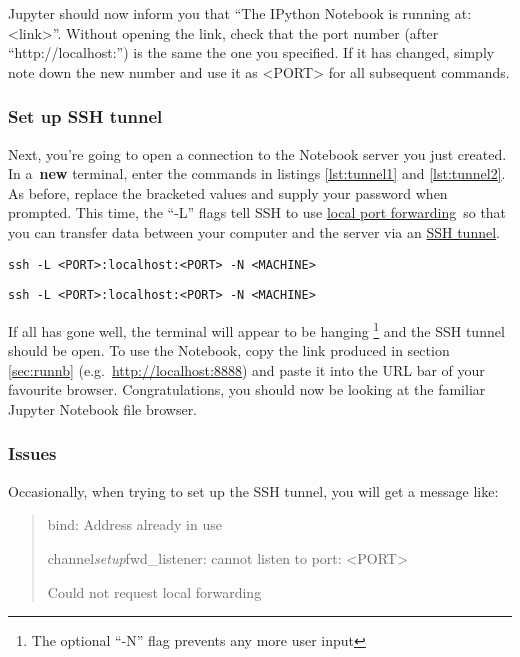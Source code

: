 \documentclass[a4paper]{article}
\begin{document}
Jupyter should now inform you that ``The IPython Notebook is running at: \textless{}link\textgreater{}''.
Without opening the link, check that the port number (after ``http://localhost:'') is the same the one you specified.
If it has changed, simply note down the new number and use it as \textless{}PORT\textgreater{} for all subsequent commands.

\subsubsection{Set up SSH tunnel}

Next, you're going to open a connection to the Notebook server you just created.
In a~\textbf{new} terminal, enter the commands in listings \ref{lst:tunnel1} and \ref{lst:tunnel2}. As before, replace the bracketed values and supply your password when prompted.
This time, the ``-L'' flags tell SSH to use \href{https://help.ubuntu.com/community/SSH/OpenSSH/PortForwarding}{local port forwarding}~so that you can transfer data between your computer and the server via an \href{http://blog.trackets.com/2014/05/17/ssh-tunnel-local-and-remote-port-forwarding-explained-with-examples.html}{SSH tunnel}.

\begin{lstlisting}[caption={Tunnel to gateway server}, label={lst:tunnel1}]
ssh -L <PORT>:localhost:<PORT> -N <MACHINE>
\end{lstlisting}

\begin{lstlisting}[caption={Tunnel to machine}, label={lst:tunnel2}]
ssh -L <PORT>:localhost:<PORT> -N <MACHINE>
\end{lstlisting}

If all has gone well, the terminal will appear to be hanging \footnote{The optional ``-N'' flag prevents any more user input} and the SSH tunnel should be open.
To use the Notebook, copy the link produced in section \ref{sec:runnb} (e.g.~\url{http://localhost:8888}) and paste it into the URL bar of your favourite browser. 
Congratulations, you should now be looking at the familiar Jupyter Notebook file browser. 

\subsubsection{Issues}

Occasionally, when trying to set up the SSH tunnel, you will get a message like:
\begin{quote}
bind: Address already in use

channel\emph{setup}fwd\_listener: cannot listen to port: \textless{}PORT\textgreater{}

Could not request local forwarding
\end{quote}
\end{document}
